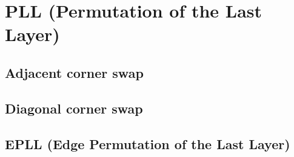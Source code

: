 \section{PLL (Permutation of the Last Layer)}

\subsection{Adjacent corner swap}


\subsection{Diagonal corner swap}


\subsection{EPLL (Edge Permutation of the Last Layer)}

